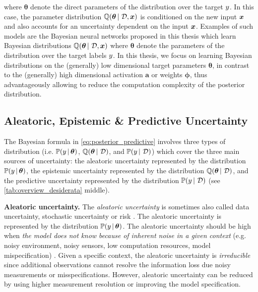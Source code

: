 where $\bm{\theta}$ denote the direct parameters of the distribution over the target $y$. In this case, the parameter distribution $\operatorname{\mathbb{Q}}(\bm{\theta} \,|\, \operatorname{\mathcal{D}}, \bm{x})$ is conditioned on the new input $\bm{x}$ and also accounts for an uncertainty dependent on the input $\bm{x}$. Examples of such models are the Bayesian neural networks proposed in this thesis \cite{charpentier2020,natpn, graph-postnet,charpentier2022uncertainty-rl,uceloss} which learn Bayesian distributions $\operatorname{\mathbb{Q}}(\bm{\theta} \,|\, \operatorname{\mathcal{D}}, \bm{x})$ where $\bm{\theta}$ denote the parameters of the distribution over the target labels $y$. In this thesis, we focus on learning  Bayesian distributions on the (generally) low dimensional target parameters $\bm{\theta}$, in contrast to the (generally) high dimensional activation $\bm{a}$ or weights  $\bm{\phi}$, thus advantageously allowing to reduce the computation complexity of the posterior distribution.

\subsection{Aleatoric, Epistemic \& Predictive Uncertainty}

The Bayesian formula in \cref{eq:posterior_predictive} involves three types of distribution (i.e. $\mathbb{P}(y \,|\, \bm{\theta})$, $\operatorname{\mathbb{Q}}(\bm{\theta} \,|\, \operatorname{\mathcal{D}})$, and $\mathbb{P}(y \,|\, \operatorname{\mathcal{D}})$) which cover the three main sources of uncertainty: the aleatoric uncertainty represented by the distribution $\mathbb{P}(y \,|\, \bm{\theta})$, the epistemic uncertainty represented by the distribution $\operatorname{\mathbb{Q}}(\bm{\theta} \,|\, \operatorname{\mathcal{D}})$, and the predictive uncertainty represented by the distribution $\mathbb{P}(y \,|\, \operatorname{\mathcal{D}})$ (see \cref{tab:overview_desiderata} middle).

\textbf{Aleatoric uncertainty.} The \emph{aleatoric uncertainty} is sometimes also called data uncertainty, stochastic uncertainty or risk \cite{hullermeier2021aleatoric,knight1921, malini2018}. 
The aleatoric uncertainty is represented by the distribution $\mathbb{P}(y \,|\, \bm{\theta})$.
The aleatoric uncertainty should be high when \emph{the model does not know because of inherent noise in a given context} (e.g. noisy environment, noisy sensors, low computation resources, model mispecification) \cite{wenger2022posterior, hullermeier2021aleatoric}.
Given a specific context, the aleatoric uncertainty is \emph{irreducible} since additional observations cannot resolve the information loss due noisy measurements or misspecifications. 
However, aleatoric uncertainty can be reduced by using higher measurement resolution or improving the model specification. 

